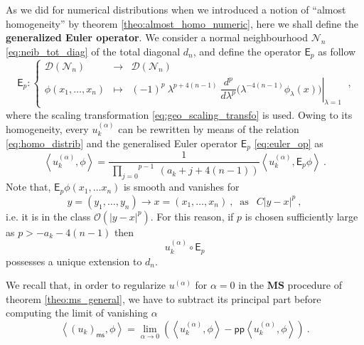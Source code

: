 \documentclass[11pt]{book}
\newcommand{\pp}{\mathsf{pp}}
\newcommand{\ms}{\mathsf{ms}}
\newcommand{\MS}{\textbf{MS}}
\newcommand{\sm}[1]{\left\langle#1\right\rangle}
\newcommand{\Dcal}{\mathcal{D}}
\newcommand{\Ncal}{\mathcal{N}}
\newcommand{\Ocal}{\mathcal{O}}
\newcommand{\Esf}{\mathsf{E}}
\theoremstyle{break}
\begin{document}
As we did for numerical distributions when we introduced a notion of ``almost homogeneity'' by theorem \ref{theo:almost_homo_numeric}, here we shall define the \textbf{generalized Euler operator}\index{$\Esf_p$}. We consider a normal neighbourhood $\Ncal_n$ \eqref{eq:neib_tot_diag} of the total diagonal $d_n$, and define the operator $\Esf_p$ as follow
%
\begin{equation}
\Esf_p : \left\{
\begin{array}{lcl}
\Dcal(\Ncal_n) & \to & \Dcal(\Ncal_n) \\
\phi(x_1,\dots, x_n) & \mapsto & \left. (-1)^p \ \lambda^{p+4(n-1)} \ \dfrac{d^p}{d\lambda^p} \bigg( \lambda^{-4(n-1)}  \phi_\lambda(x) \bigg) \right|_{\lambda = 1}
\end{array}
\right. \ ,
\label{eq:euler_op}
%
\end{equation}
%
where the scaling transformation \eqref{eq:geo_scaling_transfo} is used. Owing to its homogeneity, every $u^{(\alpha)}_k$ can be rewritten by means of the relation \eqref{eq:homo_distrib} and the generalised Euler operator $\Esf_p$ \eqref{eq:euler_op} as
%
\begin{equation}
\sm{ u^{(\alpha)}_k, \phi } = \frac{1}{\overset{p-1}{\ \underset{j=0}{\prod}} \ (a_k+j+4(n-1))}   \sm{ u^{(\alpha)}_k, \Esf_p \phi } \ .
\label{eq:expose_poles}
\end{equation}
%
Note that, $\Esf_p \phi(x_1, \dots x_n)$ is smooth and vanishes for
%
\begin{equation*}
y = (y_1 , \dots , y_n) \to x = (x_1, \dots , x_n) \ , \ \mbox{ as } \ \ C|y-x|^p \ , 
\end{equation*}
%
i.e. it is in the class $\Ocal(|y-x|^{p})$. For this reason, if  $p$ is chosen sufficiently large as $p > -a_k-4(n-1)$ then 
\begin{equation*}
u^{(\alpha)}_k \circ \Esf_p 
\end{equation*}
%
possesses a unique extension to $d_n$. 


\bigskip


We recall that, in order to regularize $u^{(\alpha)}$ for $\alpha=0$ in the $\MS$ procedure of theorem \ref{theo:ms_general}, we have to subtract its principal part before computing the limit of vanishing $\alpha$
%
\begin{equation*}
\sm{ (u_k)_\ms, \phi } = \lim_{\alpha \to 0} \left( \sm{ u^{(\alpha)}_k, \phi } - \pp\sm{ u^{(\alpha)}_k , \phi } \right) \ .
\end{equation*}
\end{document}
